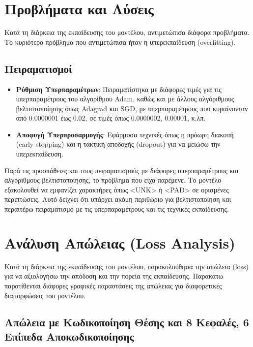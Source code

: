 \documentclass[conference]{IEEEtran}
\begin{document}
\section{Προβλήματα και Λύσεις}

Κατά τη διάρκεια της εκπαίδευσης του μοντέλου, αντιμετώπισα διάφορα προβλήματα. Το κυριότερο πρόβλημα που αντιμετώπισα ήταν η υπερεκπαίδευση (\textlatin{overfitting}).

\subsection{Πειραματισμοί}

\begin{itemize}
    \item \textbf{Ρύθμιση Υπερπαραμέτρων}: Πειραματίστηκα με διάφορες τιμές για τις υπερπαραμέτρους του αλγορίθμου \textlatin{Adam}, καθώς και με άλλους αλγόριθμους βελτιστοποίησης όπως \textlatin{Adagrad} και \textlatin{SGD}, με υπερπαραμέτρους που κυμαίνονταν από 0.0000001 έως 0.02, σε τιμές όπως 0.0000002, 0.00001, κ.λπ.
    \item \textbf{Αποφυγή Υπερπροσαρμογής}: Εφάρμοσα τεχνικές όπως η πρόωρη διακοπή (\textlatin{early stopping}) και η τακτική αποδοχής (\textlatin{dropout}) για να μειώσω την υπερεκπαίδευση.
\end{itemize}

Παρά τις προσπάθειες και τους πειραματισμούς με διάφορες υπερπαραμέτρους και αλγόριθμους βελτιστοποίησης, το πρόβλημα που είχα παρέμενε. Το μοντέλο εξακολουθεί να εμφανίζει χαρακτήρες όπως <\textlatin{UNK}> ή <\textlatin{PAD}> σε ορισμένες περιπτώσεις. Αυτό δείχνει ότι υπάρχει ακόμη περιθώριο για βελτιστοποίηση και περαιτέρω πειραματισμό με τις υπερπαραμέτρους και τις τεχνικές εκπαίδευσης.


\section{Ανάλυση Απώλειας (\textlatin{Loss Analysis})}

Κατά τη διάρκεια της εκπαίδευσης του μοντέλου, παρακολούθησα την απώλεια (\textlatin{loss}) για να αξιολογήσω την απόδοση και την πορεία της εκπαίδευσης. Παρακάτω παρατίθενται διάφορες γραφικές παραστάσεις της απώλειας για διαφορετικές διαμορφώσεις του μοντέλου.

\subsection{Απώλεια με Κωδικοποίηση Θέσης και 8 Κεφαλές, 6 Επίπεδα Αποκωδικοποίησης}
\end{document}
